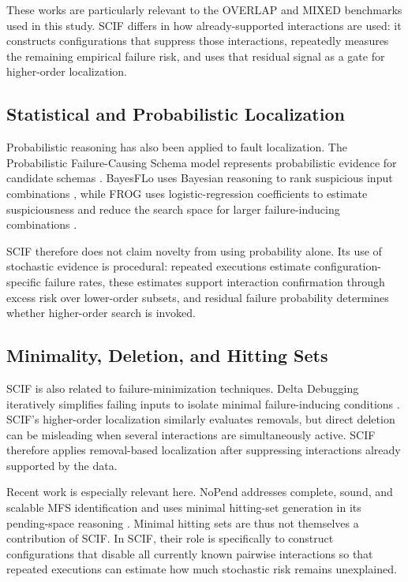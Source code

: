 These works are particularly relevant to the OVERLAP and MIXED benchmarks used in this study. SCIF differs in how already-supported interactions are used: it constructs configurations that suppress those interactions, repeatedly measures the remaining empirical failure risk, and uses that residual signal as a gate for higher-order localization.

\subsection{Statistical and Probabilistic Localization}

Probabilistic reasoning has also been applied to fault localization. The Probabilistic Failure-Causing Schema model represents probabilistic evidence for candidate schemas \cite{wang2019pfs}. BayesFLo uses Bayesian reasoning to rank suspicious input combinations \cite{ji2023bayesflo}, while FROG uses logistic-regression coefficients to estimate suspiciousness and reduce the search space for larger failure-inducing combinations \cite{nishiura2024frog}.

SCIF therefore does not claim novelty from using probability alone. Its use of stochastic evidence is procedural: repeated executions estimate configuration-specific failure rates, these estimates support interaction confirmation through excess risk over lower-order subsets, and residual failure probability determines whether higher-order search is invoked.

\subsection{Minimality, Deletion, and Hitting Sets}

SCIF is also related to failure-minimization techniques. Delta Debugging iteratively simplifies failing inputs to isolate minimal failure-inducing conditions \cite{zeller2002delta}. SCIF's higher-order localization similarly evaluates removals, but direct deletion can be misleading when several interactions are simultaneously active. SCIF therefore applies removal-based localization after suppressing interactions already supported by the data.

Recent work is especially relevant here. NoPend addresses complete, sound, and scalable MFS identification and uses minimal hitting-set generation in its pending-space reasoning \cite{xie2026nopend}. Minimal hitting sets are thus not themselves a contribution of SCIF. In SCIF, their role is specifically to construct configurations that disable all currently known pairwise interactions so that repeated executions can estimate how much stochastic risk remains unexplained.

